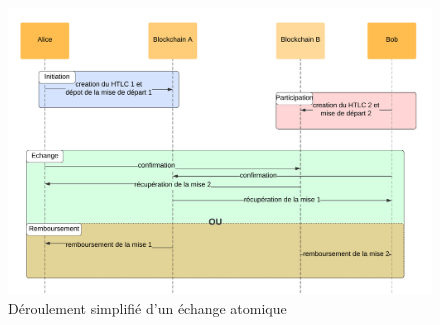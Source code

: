 \begin{figure}[h!]
    \centering
    \includegraphics[scale=0.15]{decentralisation/atomicSwap.png}
    \caption{Déroulement simplifié d'un échange atomique}
    \label{fig:atomicSwap}
\end{figure}

